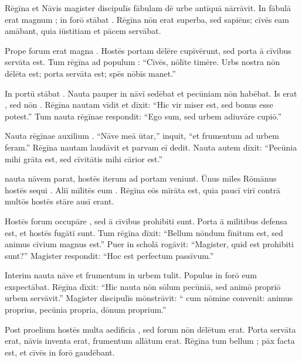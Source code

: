 \documentclass[12pt]{nextbook}
\begin{document}
\begin{readersection}{Rēgīna et Nāvis}
 magister discipulīs fābulam dē urbe antīquā nārrāvit. In fābulā erat magnum ; in forō stābat . Rēgīna nōn erat superba, sed sapiēns; cīvēs eam amābant, quia iūstitiam et pācem servābat.

Prope forum erat magna . Hostēs portam dēlēre cupīvērunt, sed porta ā cīvibus servāta est. Tum rēgīna ad populum : “Cīvēs, nōlīte timēre. Urbs nostra nōn dēlēta est; porta servāta est; spēs nōbīs manet.”

In portū stābat . Nauta pauper in nāvī sedēbat et pecūniam nōn habēbat. Is erat , sed nōn . Rēgīna nautam vīdit et dīxit: “Hic vir miser est, sed bonus esse potest.” Tum nauta rēgīnae respondit: “Ego  sum, sed urbem adiuvāre cupiō.”

Nauta rēgīnae auxilium . “Nāve meā ūtar,” inquit, “et frumentum ad urbem feram.” Rēgīna nautam laudāvit et parvam  eī dedit. Nauta autem dīxit: “Pecūnia mihi grāta est, sed  cīvitātis mihi cārior est.”

 nauta nāvem parat, hostēs iterum ad portam veniunt. Ūnus mīles Rōmānus hostēs sequi . Aliī mīlitēs eum . Rēgīna eōs mīrāta est, quia paucī virī contrā multōs hostēs stāre ausī erant.

Hostēs forum occupāre , sed ā cīvibus prohibiti sunt. Porta ā mīlitibus defensa est, et hostēs fugātī sunt. Tum rēgīna dīxit: “Bellum nōndum fīnītum est, sed animus cīvium magnus est.” Puer in scholā rogāvit: “Magister, quid est prohibiti sunt?” Magister respondit: “Hoc est perfectum passīvum.”

Interim nauta nāve  et frumentum in urbem tulit. Populus in forō eum exspectābat. Rēgīna dīxit: “Hic nauta nōn sōlum pecūniā, sed animō propriō urbem servāvit.” Magister discipulīs mōnstrāvit: “ cum nōmine convenit: animus proprius, pecūnia propria, dōnum proprium.”

Post proelium hostēs multa aedificia , sed forum nōn dēlētum erat. Porta servāta erat, nāvis inventa erat, frumentum allātum erat. Rēgīna tum bellum ; pāx facta est, et cīvēs in forō gaudēbant.


\end{readersection}
\end{document}
